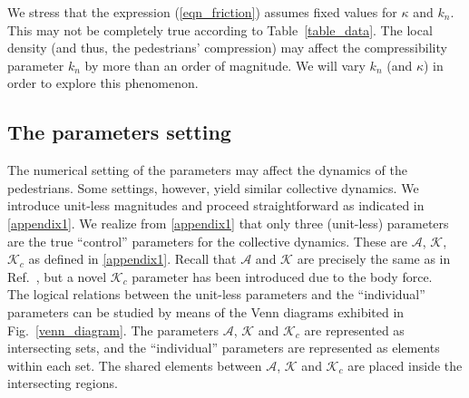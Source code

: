 \documentclass[preprint,12pt]{elsarticle}
\begin{document}
We stress that the expression (\ref{eqn_friction}) assumes fixed values for 
$\kappa$ and $k_n$. This may not be completely true according to 
Table~\ref{table_data}. The local density (and thus, the pedestrians' 
compression) may affect the compressibility parameter $k_n$ by more than an order 
of magnitude. We will vary $k_n$ (and $\kappa$) in order to explore this 
phenomenon. \\  


\subsection{\label{parameters}The parameters setting}

The numerical setting of the parameters may affect the dynamics of the 
pedestrians. Some settings, however, yield similar collective dynamics.
We introduce unit-less magnitudes 
and proceed straightforward as indicated in \ref{appendix1}. We realize from 
\ref{appendix1} that only three (unit-less) parameters  are the true 
``control'' parameters for the collective dynamics. These are $\mathcal{A}$, 
$\mathcal{K}$, $\mathcal{K}_c$ as defined in \ref{appendix1}. Recall that 
$\mathcal{A}$ and $\mathcal{K}$ are precisely the same as in 
Ref.~\cite{dorso_2019}, but a novel $\mathcal{K}_c$ parameter has been 
introduced due to the body force.   \\

The logical relations between the unit-less parameters and the ``individual'' 
parameters can be studied by means of the Venn diagrams exhibited in 
Fig.~\ref{venn_diagram}. The parameters $\mathcal{A}$, $\mathcal{K}$ and 
$\mathcal{K}_c$ are represented as intersecting sets, and the ``individual'' 
parameters are represented as elements within each set. The shared elements 
between $\mathcal{A}$, $\mathcal{K}$ and $\mathcal{K}_c$ are placed inside the 
intersecting regions. \\
\end{document}
